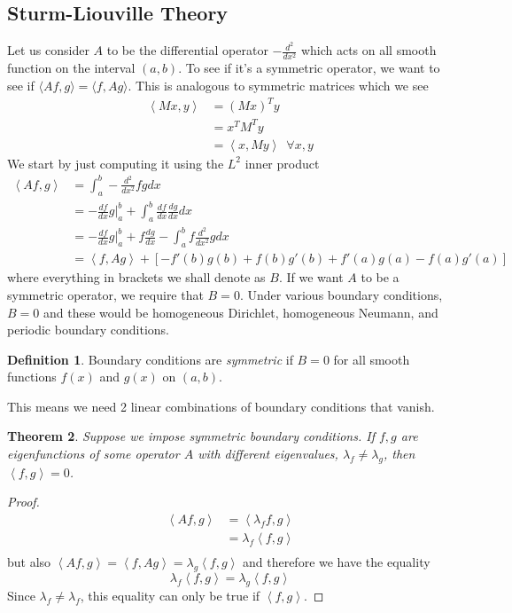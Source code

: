 \documentclass{article}
\newcommand{\od}[2]{\frac{d #1}{d #2}}
\newcommand{\odt}[2]{\frac{d^2 #1}{d #2 ^2}}
\newcommand{\ip}[2]{\left\langle #1,#2\right\rangle}
\newcommand{\push}{\,\,\,}
\newtheorem{theorem}{Theorem}[section]
\theoremstyle{definition}
\newtheorem{definition}[theorem]{Definition}
\begin{document}
\subsection{Sturm-Liouville Theory}
Let us consider $A$ to be the differential operator $-\odt{}{x}$ which acts on all smooth function on the interval $(a,b)$. To see if it's a symmetric operator, we want to see if $\langle Af, g\rangle = \langle f,Ag\rangle $. This is analogous to symmetric matrices which we see 
\begin{equation*}
    \begin{split}
        \ip{Mx}{y} &= (Mx)^Ty \\
        &=x^TM^Ty \\
        &=\ip{x}{My}\push \forall x,y
    \end{split}
\end{equation*}
We start by just computing it using the $L^2$ inner product
\begin{equation*}
    \begin{split}
        \ip{Af}{g}&=\int^b_a -\odt{}{x}fgdx \\
        &=-\od{f}{x}g\Bigg|^b_a +\int^b_a \od{f}{x}\od{g}{x}dx \\
        &=-\od{f}{x}g\Bigg|^b_a +f\od{g}{x} -\int^b_af \odt{}{x}gdx \\
        &=\ip{f}{Ag} + \left[-f'(b)g(b)+f(b)g'(b)+f'(a)g(a)-f(a)g'(a) \right]
    \end{split}
\end{equation*}
where everything in brackets we shall denote as $B$. If we want $A$ to be a symmetric operator, we require that $B=0$. Under various boundary conditions, $B=0$ and these would be homogeneous Dirichlet, homogeneous Neumann, and periodic boundary conditions. 
\begin{definition}
    Boundary conditions are \emph{symmetric} if $B=0$ for all smooth functions $f(x)$ and $g(x)$ on $(a,b)$.
\end{definition}
This means we need 2 linear combinations of boundary conditions that vanish. 
\begin{theorem}
    Suppose we impose symmetric boundary conditions. If $f,g$ are eigenfunctions of some operator $A$ with different eigenvalues,  $\lambda_f \neq \lambda _g$, then $\ip{f}{g} =0$.
\end{theorem}
\begin{proof}
    \begin{equation*}
        \begin{split}
            \ip{Af}{g} &=\ip{\lambda_ff}{g} \\
            &= \lambda_f \ip{f}{g}\\
        \end{split}
    \end{equation*}
    but also $\ip{Af}{g} =\ip{f}{Ag}=\lambda_g\ip{f}{g}$ and therefore we have the equality 
    \begin{equation*}
        \lambda_f \ip{f}{g} = \lambda_g\ip{f}{g}
    \end{equation*}
    Since $\lambda_f\neq \lambda_f$, this equality can only be true if $\ip{f}{g}$. 
\end{proof}
\end{document}
